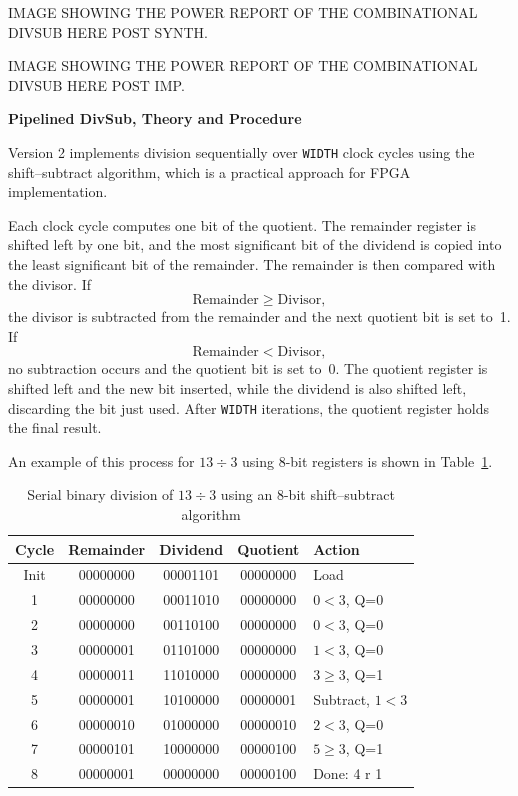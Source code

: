 \documentclass[a4paper,12pt]{article}
\begin{document}
\begin{large}
    IMAGE SHOWING THE POWER REPORT OF THE COMBINATIONAL DIVSUB HERE POST SYNTH.
\end{large}

\begin{large}
    IMAGE SHOWING THE POWER REPORT OF THE COMBINATIONAL DIVSUB HERE POST IMP.
\end{large}

\textbf{Pipelined DivSub, Theory and Procedure}

Version 2 implements division sequentially over \texttt{WIDTH} clock cycles using the shift--subtract algorithm, which is a practical approach for FPGA implementation.

Each clock cycle computes one bit of the quotient. The remainder register is shifted left by one bit, and the most significant bit of the dividend is copied into the least significant bit of the remainder. The remainder is then compared with the divisor. If
\begin{equation}
\text{Remainder} \geq \text{Divisor},
\end{equation}
the divisor is subtracted from the remainder and the next quotient bit is set to~1. If
\begin{equation}
\text{Remainder} < \text{Divisor},
\end{equation}
no subtraction occurs and the quotient bit is set to~0. The quotient register is shifted left and the new bit inserted, while the dividend is also shifted left, discarding the bit just used. After \texttt{WIDTH} iterations, the quotient register holds the final result.

An example of this process for $13 \div 3$ using 8-bit registers is shown in Table~\ref{tab:serial_div}.

\begin{table}[h]
\centering
\begin{tabular}{c c c c l}
\hline
\textbf{Cycle} & \textbf{Remainder} & \textbf{Dividend} & \textbf{Quotient} & \textbf{Action} \\
\hline
Init & 00000000 & 00001101 & 00000000 & Load \\
1 & 00000000 & 00011010 & 00000000 & $0<3$, Q=0 \\
2 & 00000000 & 00110100 & 00000000 & $0<3$, Q=0 \\
3 & 00000001 & 01101000 & 00000000 & $1<3$, Q=0 \\
4 & 00000011 & 11010000 & 00000000 & $3\ge3$, Q=1 \\
5 & 00000001 & 10100000 & 00000001 & Subtract, $1<3$ \\
6 & 00000010 & 01000000 & 00000010 & $2<3$, Q=0 \\
7 & 00000101 & 10000000 & 00000100 & $5\ge3$, Q=1 \\
8 & 00000001 & 00000000 & 00000100 & Done: 4 r 1 \\
\hline
\end{tabular}
\caption{Serial binary division of $13 \div 3$ using an 8-bit shift--subtract algorithm}
\label{tab:serial_div}
\end{table}
\end{document}
